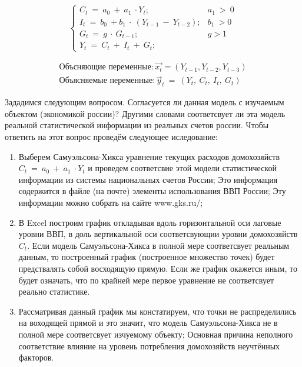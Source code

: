 \documentclass[12pt,a4paper]{article}
\begin{document}
\begin{equation*}
\begin{cases}
C_{t} \ =\ a_{0} \ +\ a_{1} \ \cdot Y_{t} ; & a_{1} \  >\ 0\\
I_{t} \ =\ b_{0} \ +b_{1} \ \cdot \ ( Y_{t-1} \ -\ Y_{t-2}) ; & b_{1} \  >0\\
G_{t} \ =\ g\ \cdot \ G_{t-1} ; & g >1\\
Y_{t} \ =\ C_{t} \ +\ I_{t} \ +\ G_{t} ; & 
\end{cases}
\end{equation*}

\begin{gather*}
\text{Объсняющие\ переменные}:\overrightarrow{x_{t}} =( Y_{t-1} ,Y_{t-2} ,Y_{t-3})\\
\text{Объясняемые\ переменные}:\vec{y}_{t} \ =\ ( Y_{t} ,\ C_{t} ,\ I_{t} ,\ G_{t})
\end{gather*}

	Зададимся следующим вопросом. Согласуется ли данная модель с изучаемым объектом (экономикой россии)? Другими словами соответсвует ли эта модель реальной статистической информации из реальных счетов россии. Чтобы ответить на этот вопрос проведём следующее иследование:
\begin{enumerate}
\item Выберем Самуэльсона-Хикса уравнение текущих расходов домохозяйств $\displaystyle C_{t} \ =\ a_{0} \ +\ a_{1} \ \cdot Y_{t}$ и проведем соответсвие этой модели статистической информации из системы национальных счетов России; Это информация содержится в файле (на почте) элементы использования ВВП России; Эту информации можно собрать на сайте www.gks.ru/;
\item В Excel построим график откладывая вдоль горизонтальной оси лаговые уровни ВВП, в доль вертикальной оси соответсвующии уровни домохозяйств $\displaystyle C_{t}$. Если модель Самуэльсона-Хикса в полной мере соответсвует реальным данным, то построенный график (построенное множество точек) будет предствалять собой восходящую прямую. Если же график окажется иным, то будет означать, что по крайней мере первое уравнение не соответсвует реально статистике.
\item Рассматривая данный график мы констатируем, что точки не распределились на воходящей прямой и это значит, что модель Самуэльсона-Хикса не в полной мере соответсвует изчуемому объекту; Основная причина неполного соответствие влияние на уровень потребления домохозяйств неучтённых факторов.
\end{enumerate}
\end{document}
